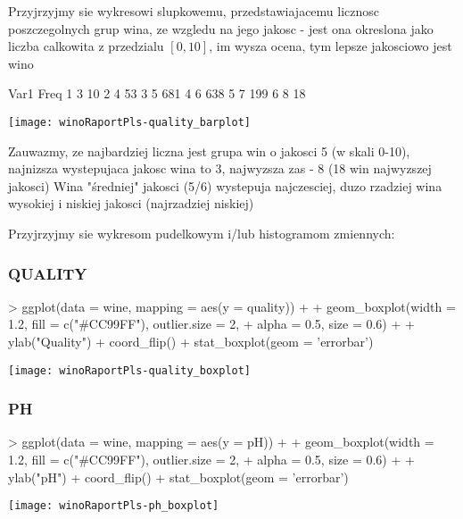 \documentclass{article}
\begin{document}
Przyjrzyjmy sie wykresowi slupkowemu, przedstawiajacemu  licznosc poszczegolnych grup wina, 
ze wzgledu na jego jakosc - jest ona okreslona jako liczba calkowita
z przedzialu $[0,10]$, im wysza ocena, tym lepsze jakosciowo jest wino

\begin{Schunk}
\begin{Soutput}
  Var1 Freq
1    3   10
2    4   53
3    5  681
4    6  638
5    7  199
6    8   18
\end{Soutput}
\end{Schunk}
\texttt{[image: winoRaportPls-quality\_barplot]}


Zauwazmy, ze najbardziej liczna jest grupa win o jakosci 5 (w skali 0-10), najnizsza wystepujaca jakosc wina to 3, 
najwyzsza zas - 8 (18 win najwyzszej jakosci)
\newline
Wina "średniej" jakosci (5/6) wystepuja najczesciej, duzo rzadziej wina wysokiej i niskiej 
jakosci (najrzadziej niskiej)



Przyjrzyjmy sie wykresom pudelkowym i/lub histogramom zmiennych:

\subsubsection{QUALITY}
\begin{Schunk}
\begin{Sinput}
> ggplot(data = wine, mapping = aes(y = quality)) + 
+     geom_boxplot(width = 1.2, fill = c("#CC99FF"), outlier.size = 2, 
+                  alpha = 0.5, size = 0.6) +
+     ylab("Quality") + coord_flip() + stat_boxplot(geom = 'errorbar')
\end{Sinput}
\end{Schunk}
\texttt{[image: winoRaportPls-quality\_boxplot]}



\subsubsection{PH}
\begin{Schunk}
\begin{Sinput}
> ggplot(data = wine, mapping = aes(y = pH)) + 
+   geom_boxplot(width = 1.2, fill = c("#CC99FF"), outlier.size = 2, 
+                alpha = 0.5, size = 0.6) +
+   ylab("pH") + coord_flip() + stat_boxplot(geom = 'errorbar')
\end{Sinput}
\end{Schunk}
\texttt{[image: winoRaportPls-ph\_boxplot]}
\end{document}
